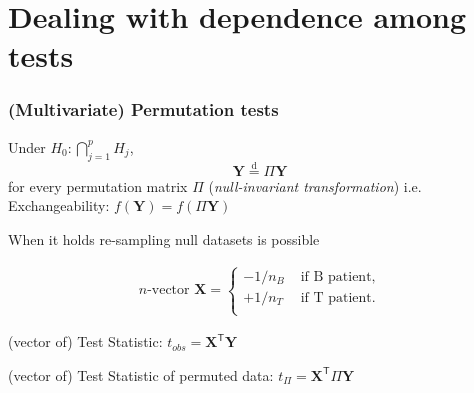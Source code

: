 \documentclass[xcolor={pdftex,dvipsnames,table}]{beamer}
\newcommand{\bb}[1]{\begin{block}{#1}}
\newcommand{\eb}{\end{block}}
\newcommand{\bi}{\begin {itemize}}
\newcommand{\ei}{\end{itemize}}
\newcommand{\Perm}{\Pi}
\begin{document}
\section{Dealing with dependence among tests}
\begin{frame}
\frametitle{(Multivariate) Permutation tests}
Under $H_0: \bigcap_{j=1}^{p}H_{j}$,%
\[
\mathbf{Y} \stackrel{\mathrm{d}}{=} \Perm\mathbf{Y} 
\]
for every permutation matrix $\Perm$ (\emph{null-invariant transformation})
i.e. \textcolor{redUnipd}{Exchangeability}: $f(\mathbf{Y})=f(\Perm\mathbf{Y})$

\bigskip
\pause
\bb{When it holds}
re-sampling null datasets is possible
\eb


\begin{eqnarray*}
\text{$n$-vector }\mathbf{X}= 
\begin{cases}
-1/n_B & \text{ if B patient},\\
+1/n_T & \text{ if T patient}.\\
\end{cases}  
\end{eqnarray*}

(vector of) Test Statistic: 
$t_{obs} = \mathbf{X}^\mathsf{T} \mathbf{Y}$

(vector of) Test Statistic of permuted data: 
$t_{\Perm} = \mathbf{X}^\mathsf{T}  \Perm \mathbf{Y}$

\end{frame}



\end{document}
